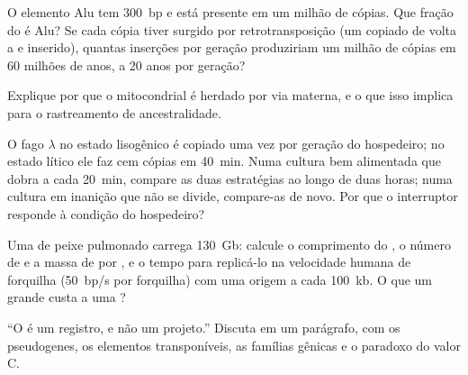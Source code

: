 \begin{exercise}[$\star\star$]\label{exo:b1:genomes:8}
O elemento Alu tem \qty{300}{bp} e está presente em um milhão de cópias.
Que fração do  é Alu? Se cada cópia tiver surgido por
retrotransposição (um  copiado de volta a  e inserido), quantas
inserções por geração produziriam um milhão de cópias em \num{60}
milhões de anos, a \num{20} anos por geração?
\end{exercise}

\begin{exercise}[$\star\star$]\label{exo:b1:genomes:9}
Explique por que o  mitocondrial é herdado por via materna, e o
que isso implica para o rastreamento de ancestralidade.
\end{exercise}

\begin{exercise}[$\star\star\star$]\label{exo:b1:genomes:10}
O fago $\lambda$ no estado lisogênico é copiado uma vez por geração do
hospedeiro; no estado lítico ele faz cem cópias em \qty{40}{min}. Numa
cultura bem alimentada que dobra a cada \qty{20}{min}, compare as duas
estratégias ao longo de duas horas; numa cultura em inanição que não se
divide, compare-as de novo. Por que o interruptor responde à condição do
hospedeiro?
\end{exercise}

\begin{exercise}[$\star\star\star$]\label{exo:b1:genomes:11}
Uma  de peixe pulmonado carrega \qty{130}{Gb}: calcule o
comprimento do , o número de  e a massa de  por
, e o tempo para replicá-lo na velocidade humana de forquilha
(\qty{50}{bp/s} por forquilha) com uma origem a cada \qty{100}{kb}. O
que um  grande custa a uma ?
\end{exercise}

\begin{exercise}[$\star\star\star$]\label{exo:b1:genomes:12}
``O  é um registro, e não um projeto.'' Discuta em um parágrafo,
com os pseudogenes, os elementos transponíveis, as famílias gênicas e o
paradoxo do valor C.
\end{exercise}

